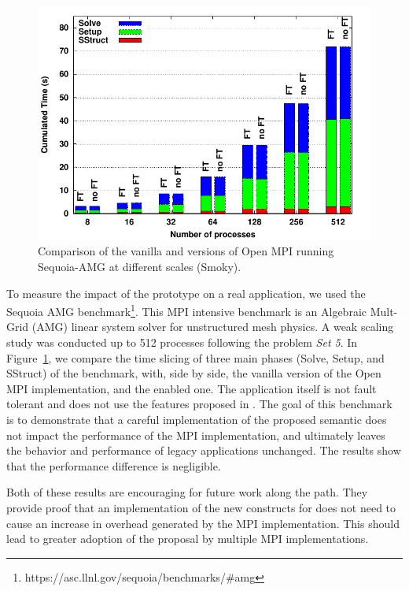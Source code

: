 
\begin{figure}
    \includegraphics[width=\linewidth]{figures/bargraph.pdf}
    \caption{Comparison of the vanilla and \ulfm versions of Open MPI running
    Sequoia-AMG at different scales (Smoky).}
    \label{fig:sequoia:bargraph}
\end{figure}

To measure the impact of the prototype on a real application, we used the
Sequoia AMG benchmark\footnote{https://asc.llnl.gov/sequoia/benchmarks/\#amg}.
This MPI intensive benchmark is an Algebraic Mult-Grid (AMG) linear system
solver for unstructured mesh physics. A weak scaling study was conducted up to
512 processes following the problem \emph{Set 5}. In
Figure~\ref{fig:sequoia:bargraph}, we compare the time slicing of three main
phases (Solve, Setup, and SStruct) of the benchmark, with, side by side, the
vanilla version of the Open MPI implementation, and the \ulfm enabled one. The
application itself is not fault tolerant and does not use the features proposed
in \ulfm. The goal of this benchmark is to demonstrate that a careful
implementation of the proposed semantic does not impact the performance of the
MPI implementation, and ultimately leaves the behavior and performance of legacy
applications unchanged. The results show that the performance difference is
negligible.

Both of these results are encouraging for future work along the \ulfm path. They
provide proof that an implementation of the new constructs for \ulfm does not
need to cause an increase in overhead generated by the MPI implementation. This
should lead to greater adoption of the \ulfm proposal by multiple MPI
implementations.


